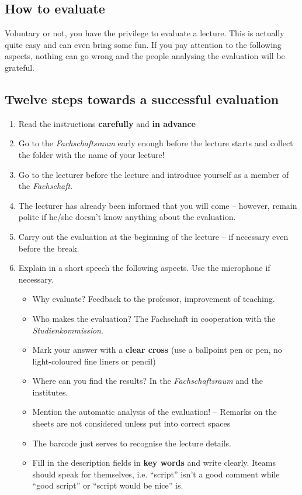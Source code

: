 \documentclass[a4paper,10pt]{article}
\begin{document}
\subsection*{How to evaluate}
Voluntary or not, you have the privilege to evaluate a lecture.  This is actually quite easy and can even bring some fun. If you pay attention to the following aspects, nothing can go wrong and the people analysing the evaluation will be grateful.

\subsection*{Twelve steps towards a successful evaluation}
\begin{enumerate}
\item Read the instructions \textbf{carefully} and \textbf{in advance}
\item Go to the \textit{Fachschaftsraum} early enough before the lecture starts and collect the folder with the name of your lecture!
\item Go to the lecturer before the lecture and introduce yourself as a member of the \textit{Fachschaft}.
\item The lecturer has already been informed that you will come -- however, remain polite if he/she doesn't know anything about the evaluation.
\item Carry out the evaluation at the beginning of the lecture -- if necessary even before the break.
\item Explain in a short speech the following aspects. Use the microphone if necessary.
    \begin{itemize}
    \item Why evaluate? Feedback to the professor, improvement of teaching.
    \item Who makes the evaluation? The Fachschaft in cooperation with the \textit{Studienkommission}.
    \item Mark your answer with a \textbf{clear cross} (use a ballpoint pen or pen, no light-coloured fine liners or pencil)
    \item Where can you find the results? In the \textit{Fachschaftsraum} and the institutes.
    \item Mention the automatic analysis of the evaluation! -- Remarks on the sheets are not considered unless put into correct spaces
    \item The barcode just serves to recognise the lecture details.
    \item Fill in the description fields in \textbf{key words} and write clearly. Iteams should speak for themselves, i.e. ``script'' isn't a good comment while ``good script'' or ``script would be nice'' is.

\end{itemize}
\end{enumerate}
\end{document}
